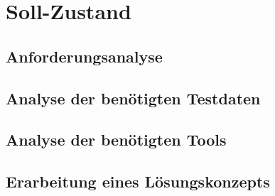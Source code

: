 \chapter{Soll-Zustand}\label{ch:sollzustand}


\section{Anforderungsanalyse}\label{sec:anforderungen}


\section{Analyse der benötigten Testdaten}\label{sec:testdatenanalyse}


\section{Analyse der benötigten Tools}\label{sec:toolanalyse}


\section{Erarbeitung eines Lösungskonzepts}\label{sec:loesungskonzept}